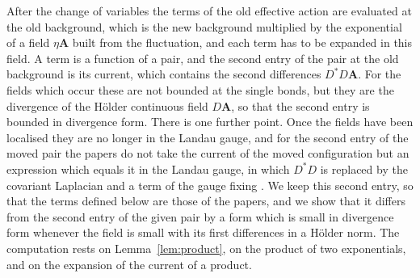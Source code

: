 \documentclass[11pt]{preprint}
\numberwithin{equation}{section}
\begin{document}
After the change of variables the terms of the old effective action are evaluated at the old background, which is the new background multiplied by the exponential of a field $\eta\mathbf A$ built from the fluctuation, and each term has to be expanded in this field. A term is a function of a pair, and the second entry of the pair at the old background is its current, which contains the second differences $D^*D\mathbf A$. For the fields which occur these are not bounded at the single bonds, but they are the divergence of the H\"older continuous field $D\mathbf A$, so that the second entry is bounded in divergence form. There is one further point. Once the fields have been localised they are no longer in the Landau gauge, and for the second entry of the moved pair the papers do not take the current of the moved configuration but an expression which equals it in the Landau gauge, in which $D^*D$ is replaced by the covariant Laplacian and a term of the gauge fixing \cite[(3.10)--(3.14), p.~272]{BalabanRG1}. We keep this second entry, so that the terms defined below are those of the papers, and we show that it differs from the second entry of the given pair by a form which is small in divergence form whenever the field is small with its first differences in a H\"older norm. The computation rests on Lemma~\ref{lem:product}, on the product of two exponentials, and on the expansion of the current of a product.
\end{document}
